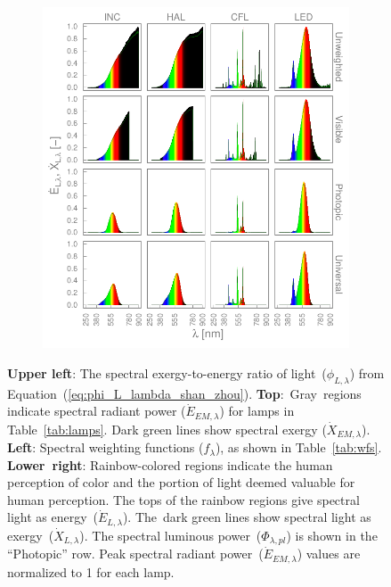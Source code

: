 \documentclass[energies,article,accept,moreauthors,pdftex]{Definitions/mdpi}\usepackage[]{graphicx}\usepackage[]{color}
\makeatletter
\def\maxwidth{ %
  \ifdim\Gin@nat@width>\linewidth
    \linewidth
  \else
    \Gin@nat@width
  \fi
}
\newenvironment{knitrout}{}{} %
\makeatother
\begin{document}
\begin{figure}[H]
\begin{subfigure}[t]{0.74\textwidth}
\begin{knitrout}
\hfill{}\includegraphics[width=\maxwidth]{figure/Responses_Graph_Energy-1} 



\end{knitrout}
        \label{fig:lamp_responses}
    \end{subfigure}%
    \caption{\textbf{Upper left}: The spectral exergy-to-energy ratio of light~($\phi_{L,\lambda}$) 
                         from Equation~(\ref{eq:phi_L_lambda_shan_zhou}). 
             \mbox{\textbf{Top}: Gray regions} indicate spectral radiant power ($\dot{E}_{EM,\lambda}$)
                  for lamps in Table~\ref{tab:lamps}.
                  Dark green lines show spectral exergy ($\dot{X}_{EM,\lambda}$).
             \textbf{Left}: Spectral weighting functions ($f_\lambda$), as shown in Table~\ref{tab:wfs}.
             \mbox{\textbf{Lower right}}: Rainbow-colored regions indicate the human perception of color 
                          and the portion of light deemed valuable for human perception.
                          The tops of the rainbow regions give spectral light as energy~($\dot{E}_{L,\lambda}$).
                          \mbox{The dark} green lines show spectral light as exergy~($\dot{X}_{L,\lambda}$).
                          The spectral luminous power~($\Phi_{\lambda,pl}$) 
                          is shown in the ``Photopic'' row. 
             Peak spectral radiant power~($\dot{E}_{EM,\lambda}$) values are normalized to 1  
             for each lamp.}
	\label{fig:wfs_and_lamps}
\end{figure}
\end{document}
